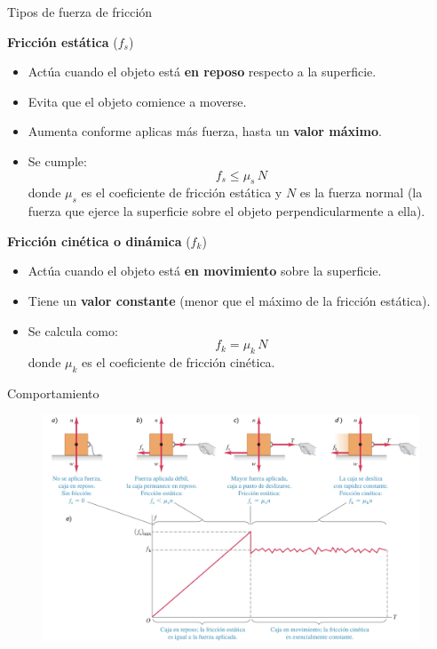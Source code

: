 \begin{frame}{Tipos de fuerza de fricción}

    \textbf{Fricción estática} (\( f_s \))
    \begin{itemize}
        \item Actúa cuando el objeto está \textbf{en reposo} respecto a la superficie.
        \item Evita que el objeto comience a moverse.
        \item Aumenta conforme aplicas más fuerza, hasta un \textbf{valor máximo}.
        \item Se cumple:
        \[
        f_s \leq \mu_s \, N
        \]
        donde \(\mu_s\) es el coeficiente de fricción estática y \(N\) es la fuerza normal (la fuerza que ejerce la superficie sobre el objeto perpendicularmente a ella).
    \end{itemize}
    \end{frame}

    \begin{frame}
        \textbf{Fricción cinética o dinámica} (\( f_k \))
    \begin{itemize}
        \item Actúa cuando el objeto está \textbf{en movimiento} sobre la superficie.
        \item Tiene un \textbf{valor constante} (menor que el máximo de la fricción estática).
        \item Se calcula como:
        \[
        f_k = \mu_k \, N
        \]
        donde \(\mu_k\) es el coeficiente de fricción cinética.
    \end{itemize}
    \end{frame}

\begin{frame}{Comportamiento}
    \begin{figure}
        \centering
        \includegraphics[width=1\linewidth]{figures/friccion.jpg}
    \end{figure}
\end{frame}

